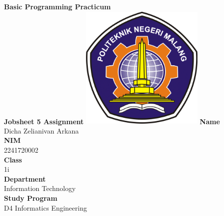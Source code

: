 \documentclass[12pt,titlepage]{article}
\newcommand{\vSubject}{Basic Programming Practicum}
\newcommand{\vSubtitle}{Jobsheet 5 Assignment}
\newcommand{\vName}{Dicha Zelianivan Arkana}
\newcommand{\vNIM}{2241720002}
\newcommand{\vClass}{1i}
\newcommand{\vDepartment}{Information Technology}
\newcommand{\vStudyProgram}{D4 Informatics Engineering}
\begin{document}
\begin{titlepage}
    \centering
    \vfill
    {\bfseries\LARGE
        \vSubject\\
        \vskip0.25cm
        \vSubtitle
    }
    \vfill
    \includegraphics[width=6cm]{images/polinema-logo.png}
    \vfill
    {
        \textbf{Name}\\
        \vName\\
        \vskip0.5cm
        \textbf{NIM}\\
        \vNIM\\
        \vskip0.5cm
        \textbf{Class}\\
        \vClass\\
        \vskip0.5cm
        \textbf{Department}\\
        \vDepartment\\
        \vskip0.5cm
        \textbf{Study Program}\\
        \vStudyProgram
    }
\end{titlepage}
\end{document}
